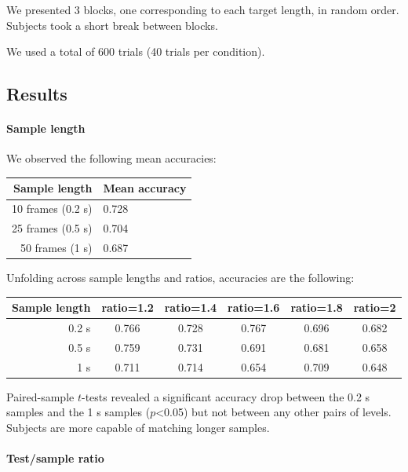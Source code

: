 We presented 3 blocks, one corresponding to each target length, in random order. Subjects took a short break between blocks.

We used a total of 600 trials (40 trials per condition).

\subsection{Results}

\paragraph{Sample length}

We observed the following mean accuracies:


\begin{center}
\begin{tabular}{ r | l   }
\textbf{Sample length} & \textbf{Mean accuracy}\\
\hline
10 frames (0.2 s) & 0.728\\
 25 frames (0.5 s)&  0.704\\
 50 frames (1 s)&  0.687\\
\end{tabular}
\end{center}

Unfolding across sample lengths and ratios, accuracies are the following:

\label{ex1:accs}
\begin{center}
\begin{tabular}{ r | c | c | c | c | c    }
Sample length & ratio=1.2 & ratio=1.4 & ratio=1.6 & ratio=1.8 & ratio=2 \\
\hline

0.2 s & 0.766&  0.728&  0.767&  0.696&  0.682 \\
0.5 s & 0.759&  0.731&  0.691& 0.681& 0.658\\
1 s & 0.711& 0.714&  0.654&  0.709&  0.648\\
\end{tabular}
\end{center}

Paired-sample $t$-tests revealed a significant accuracy drop between the 0.2 s samples and the 1 s samples ($p$<0.05) but not between any other pairs of levels. Subjects are more capable of matching longer samples.

\paragraph{Test/sample ratio}

